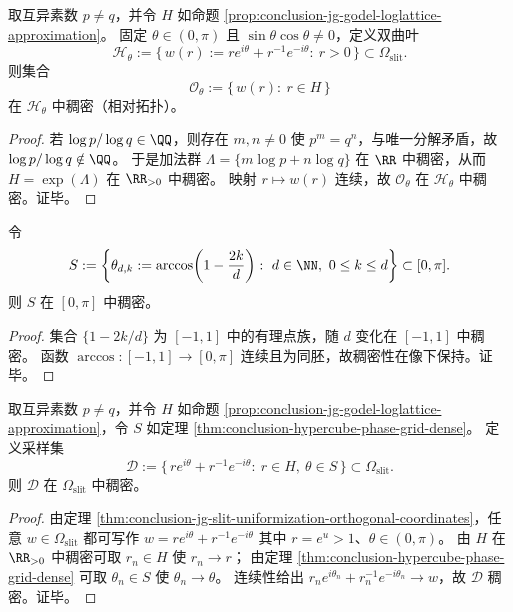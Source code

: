 \begin{theorem}\label{thm:conclusion-jg-godel-dense-orbits-on-hyperbola-leaf}
取互异素数 \(p\neq q\)，并令 \(H\) 如命题 \ref{prop:conclusion-jg-godel-loglattice-approximation}。
固定 \(\theta\in(0,\pi)\) 且 \(\sin\theta\cos\theta\neq 0\)，定义双曲叶
\[
\mathcal H_{\theta}:=\{\,w(r):=r e^{i\theta}+r^{-1}e^{-i\theta}:\ r>0\,\}\subset\Omega_{\mathrm{slit}}.
\]
则集合
\[
\mathcal O_{\theta}:=\{\,w(r):\ r\in H\,\}
\]
在 \(\mathcal H_{\theta}\) 中稠密（相对拓扑）。
\end{theorem}
\begin{proof}
若 \(\log p/\log q\in\QQ\)，则存在 \(m,n\neq 0\) 使 \(p^m=q^n\)，与唯一分解矛盾，故 \(\log p/\log q\notin\QQ\)。
于是加法群 \(\Lambda=\{m\log p+n\log q\}\) 在 \(\RR\) 中稠密，从而 \(H=\exp(\Lambda)\) 在 \(\RR_{>0}\) 中稠密。
映射 \(r\mapsto w(r)\) 连续，故 \(\mathcal O_\theta\) 在 \(\mathcal H_\theta\) 中稠密。证毕。
\end{proof}

\begin{theorem}\label{thm:conclusion-hypercube-phase-grid-dense}
令
\[
S:=\left\{\theta_{d,k}:=\arccos\!\left(1-\frac{2k}{d}\right):\ d\in\NN,\ 0\le k\le d\right\}\subset[0,\pi].
\]
则 \(S\) 在 \([0,\pi]\) 中稠密。
\end{theorem}
\begin{proof}
集合 \(\{1-2k/d\}\) 为 \([-1,1]\) 中的有理点族，随 \(d\) 变化在 \([-1,1]\) 中稠密。
函数 \(\arccos:[-1,1]\to[0,\pi]\) 连续且为同胚，故稠密性在像下保持。证毕。
\end{proof}

\begin{theorem}\label{thm:conclusion-jg-godel-hypercube-dense-sampling-omega}
取互异素数 \(p\neq q\)，并令 \(H\) 如命题 \ref{prop:conclusion-jg-godel-loglattice-approximation}，令 \(S\) 如定理 \ref{thm:conclusion-hypercube-phase-grid-dense}。
定义采样集
\[
\mathcal D:=\{\,r e^{i\theta}+r^{-1}e^{-i\theta}:\ r\in H,\ \theta\in S\,\}\subset\Omega_{\mathrm{slit}}.
\]
则 \(\mathcal D\) 在 \(\Omega_{\mathrm{slit}}\) 中稠密。
\end{theorem}
\begin{proof}
由定理 \ref{thm:conclusion-jg-slit-uniformization-orthogonal-coordinates}，任意 \(w\in\Omega_{\mathrm{slit}}\) 都可写作
\(
w=r e^{i\theta}+r^{-1}e^{-i\theta}
\)
其中 \(r=e^{u}>1\)、\(\theta\in(0,\pi)\)。
由 \(H\) 在 \(\RR_{>0}\) 中稠密可取 \(r_n\in H\) 使 \(r_n\to r\)；
由定理 \ref{thm:conclusion-hypercube-phase-grid-dense} 可取 \(\theta_n\in S\) 使 \(\theta_n\to\theta\)。
连续性给出
\(
r_n e^{i\theta_n}+r_n^{-1}e^{-i\theta_n}\to w
\)，故 \(\mathcal D\) 稠密。证毕。
\end{proof}

